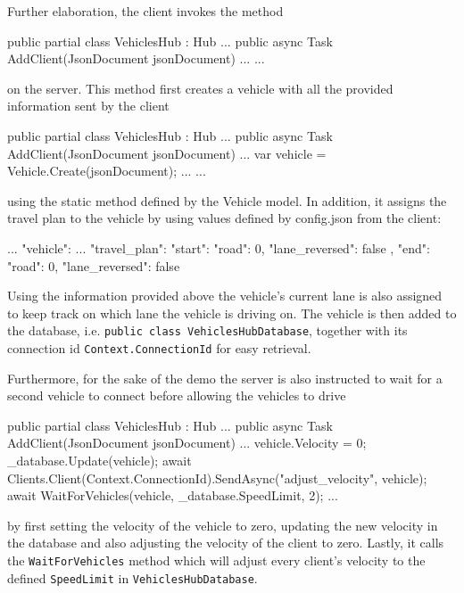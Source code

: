Further elaboration, the client invokes the method
\begin{csharp}
public partial class VehiclesHub : Hub
{
	...
	public async Task AddClient(JsonDocument jsonDocument) {...}
	...
}
\end{csharp}
on the server. This method first creates a vehicle with all the provided information sent by the client
\begin{csharp}
public partial class VehiclesHub : Hub
{
	...
	public async Task AddClient(JsonDocument jsonDocument)
	{
		...
		var vehicle = Vehicle.Create(jsonDocument);
		...
	}
	...
}
\end{csharp}
using the static method defined by the Vehicle model. In addition, it assigns the travel plan to the vehicle by using values defined by config.json from the client:
\begin{json}
{
	...
	"vehicle": {
		...
		"travel_plan": {
			"start": {
				"road": 0,
				"lane_reversed": false
			},
			"end": {
				"road": 0,
				"lane_reversed": false
			}
		}
	}
}
\end{json}

Using the information provided above the vehicle's current lane is also assigned to keep track on which lane the vehicle is driving on. The vehicle is then added to the database, i.e. \verb|public class VehiclesHubDatabase|, together with its connection id \verb|Context.ConnectionId| for easy retrieval.

Furthermore, for the sake of the demo the server is also instructed to wait for a second vehicle to connect before allowing the vehicles to drive
\begin{csharp}
public partial class VehiclesHub : Hub
{
	...
	public async Task AddClient(JsonDocument jsonDocument)
	{
		...
		vehicle.Velocity = 0;
		_database.Update(vehicle);
		await Clients.Client(Context.ConnectionId).SendAsync("adjust_velocity", vehicle);
		await WaitForVehicles(vehicle, _database.SpeedLimit, 2);
	}
	...
}
\end{csharp}
by first setting the velocity of the vehicle to zero, updating the new velocity in the database and also adjusting the velocity of the client to zero. Lastly, it calls the \verb|WaitForVehicles| method which will adjust every client's velocity to the defined \verb|SpeedLimit| in \verb|VehiclesHubDatabase|.

